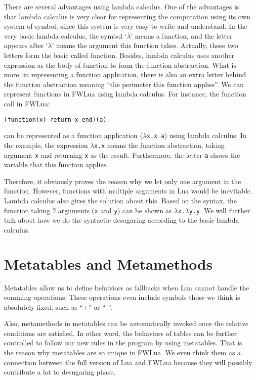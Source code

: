 There are several advantages using lambda calculus. One of the advantages is that lambda calculus is very clear for representing the computation using its own system of symbol, since this system is very easy to write and understand. In the very basic lambda calculus, the symbol `$\lambda$' means a function, and the letter appears after `$\lambda$' means the argument this function takes. Actually, these two letters form the basic called function. Besides, lambda calculus uses another expression as the body of function to form the function abstraction. What is more, in representing a function application, there is also an extra letter behind the function abstraction meaning ``the perimeter this function applies''. We can represent functions in FWLua using lambda calculus. For instance, the function call in FWLua:
\begin{verbatim}
(function(x) return x end)(a)
\end{verbatim}
can be represented as a function application ({\tt $\lambda$x.x a}) using lambda calculus. In the example, the expression {\tt $\lambda$x.x} means the function abstraction, taking argument {\tt x} and returning {\tt x} as the result. Furthermore, the letter {\tt a} shows the variable that this function applies.

Therefore, it obviously proves the reason why we let only one argument in the function. However, functions with multiple arguments in Lua would be inevitable. Lambda calculus also gives the solution about this. Based on the syntax, the function taking 2 arguments ({\tt x} and {\tt y}) can be shown as {\tt $\lambda$x.$\lambda$y.y}. We will further talk about how we do the syntactic desugaring according to the basic lambda calculus.

\newcommand{\abFunction}[2]{{\tt function} ~{#1}~{\tt return}~{#2}~{\tt end}}
\newcommand{\semanticFullRaw}[4]{{#1},{#2} \Downarrow {#3},{#4}}
\newcommand{\semanticFull}[4]{{#1},{#2} \Downarrow {#3}, {#4}}


\section{Metatables and Metamethods}
Metatables allow us to define behaviors as fallbacks when Lua cannot handle the comming operations. These operations even include symbols those we think is absolutely fixed, such as ``+'' or ``-''.

Also, metamethods in metatables can be automatically invoked once the relative conditions are satisfied. In other word, the behaviors of tables can be further controlled to follow our new rules in the program by using metatables. That is the reason why metatables are so unique in FWLua. We even think them as a connection between the full version of Lua and FWLua because they will possibly contribute a lot to desugaring phase.

